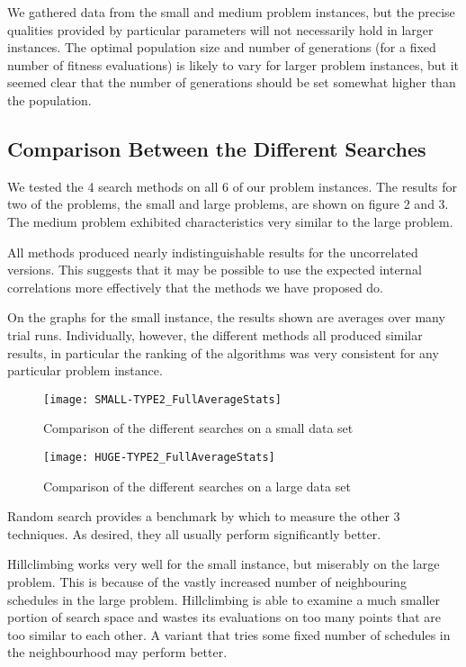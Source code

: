 \documentclass[letterpaper]{article}
\begin{document}
        We gathered data from the small and medium problem instances, but the precise qualities 
        provided by particular parameters will not necessarily hold in larger instances. The 
        optimal population size and number of generations (for a fixed number of fitness 
        evaluations) is likely to vary for larger problem instances, but it seemed clear that 
        the number of generations should be set somewhat higher than the population.
      
  \subsection{Comparison Between the Different Searches}
    We tested the 4 search methods on all 6 of our problem instances. The results 
    for two of the problems, the small and large problems, are shown on figure 2 
    and 3. The medium problem exhibited characteristics very similar to the large problem.
    
    All methods produced nearly indistinguishable results for the uncorrelated 
    versions. This suggests that it may be possible to use the expected internal 
    correlations more effectively that the methods we have proposed do.
    
    On the graphs for the small instance, the results shown are averages over many trial 
    runs. Individually, however, the different methods all produced similar results, in 
    particular the ranking of the algorithms was very consistent for any particular problem 
    instance.
    
    \begin{figure}[h]
  	  \centering
  	  \texttt{[image: SMALL-TYPE2\_FullAverageStats]}
      \caption{Comparison of the different searches on a small data set}
	\end{figure}
	
	\begin{figure}[h]
  	  \centering
  	  \texttt{[image: HUGE-TYPE2\_FullAverageStats]}
      \caption{Comparison of the different searches on a large data set}
	\end{figure}
	
	Random search provides a benchmark by which to measure the other 3 techniques. 
	As desired, they all usually perform significantly better.
	
	Hillclimbing works very well for the small instance, but miserably on the large 
	problem. This is because of the vastly increased number of neighbouring schedules 
	in the large problem. Hillclimbing is able to examine a much smaller portion of 
	search space and wastes its evaluations on too many points that are too similar 
	to each other. A variant that tries some fixed number of schedules in the 
	neighbourhood may perform better.
	
\end{document}

